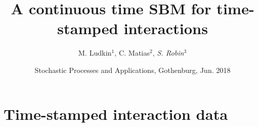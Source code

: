\documentclass[8pt]{beamer}
\begin{document}

\title[Continuous time SBM]{A continuous	time SBM for time-stamped interactions}

\author[S. Robin]{M. Ludkin$^1$, C. Matias$^2$, {\sl S. Robin}$^3$}


\date[SPA'18, Gothenburg]{Stochastic Processes and Applications, Gothenburg, Jun. 2018}

\maketitle


\section{Time-stamped interaction data}
\end{document}
